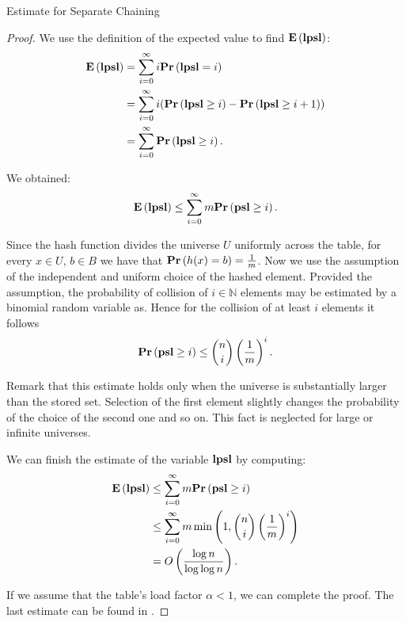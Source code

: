 \begin{section}{Estimate for Separate Chaining}
\begin{proof}
We use the definition of the expected value to find $\mathbf{E}\left(\mathbf{lpsl}\right)$:
\begin{displaymath}
\begin{split}
\mathbf{E}\left(\mathbf{lpsl}\right)
	& = \displaystyle \sum_{i=0}^{\infty} i \mathbf{Pr}\left(\mathbf{lpsl} = i\right) \\
	& = \displaystyle \sum_{i = 0}^{\infty} i (\mathbf{Pr}\left(\mathbf{lpsl} \geq i\right) - \mathbf{Pr}\left(\mathbf{lpsl} \geq i + 1\right)) \\ 
	& = \displaystyle \sum_{i = 0}^{\infty} \mathbf{Pr}\left(\mathbf{lpsl} \geq i\right) \text{.}
\end{split}
\end{displaymath}

We obtained:
\begin{displaymath}
\mathbf{E}\left(\mathbf{lpsl}\right) \leq \displaystyle \sum_{i = 0}^{\infty} m \mathbf{Pr}\left(\mathbf{psl} \geq i\right) \text{.}
\end{displaymath}

Since the hash function divides the universe $U$ uniformly across the table, for every $x \in U$, $b \in B$ we have that $\mathbf{Pr}\left(h(x) = b\right) = \frac{1}{m}$. Now we use the assumption of the independent and uniform choice of the hashed element. Provided the assumption, the probability of collision of $i \in \mathbb{N}$ elements may be estimated by a binomial random variable as. Hence for the collision of at least $i$ elements it follows
\begin{displaymath}
\mathbf{Pr}\left(\mathbf{psl} \geq i\right) \leq \dbinom{n}{i}\left(\frac{1}{m}\right)^i \text{.}
\end{displaymath}

Remark that this estimate holds only when the universe is substantially larger than the stored set. Selection of the first element slightly changes the probability of the choice of the second one and so on. This fact is neglected for large or infinite universes.

We can finish the estimate of the variable $\mathbf{lpsl}$ by computing:
\begin{displaymath}
\begin{split}
\mathbf{E}\left(\mathbf{lpsl}\right)	& \leq \displaystyle \sum_{i = 0}^{\infty} m \mathbf{Pr}\left(\mathbf{psl} \geq i\right) \\
		& \leq \displaystyle \sum_{i = 0}^{\infty} m \min\left(1, \dbinom{n}{i}\left(\frac{1}{m}\right)^i\right) \\
		& = O\left(\frac{\log n}{\log \log n}\right) \text{.}
\end{split}
\end{displaymath}

If we assume that the table's load factor $\alpha < 1$, we can complete the proof. The last estimate can be found in \cite{DBLP:books/sp/Mehlhorn84}.
\end{proof}
\end{section}

